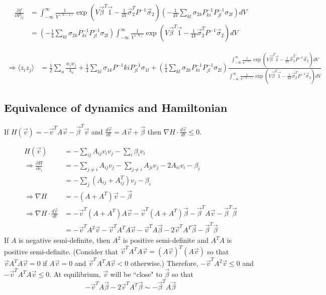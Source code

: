 \documentclass{article}
\begin{document}
\begin{align*}
\frac{\partial f}{\partial P_{ij}}&=\int_{-\infty}^\infty\frac{1}{V^{(N-1)}}\exp\left(V\vec{\beta}^T\vec{1}-\frac{1}{4V}\vec{\sigma}_2^TP^{-1}\vec{\sigma}_2\right)\left(-\frac{1}{4V}\sum_{kl}\sigma_{2k}P^{-1}_{ki}P^{-1}_{jl}\sigma_{2l}\right)dV
\\&=\left(-\frac{1}{4}\sum_{kl}\sigma_{2k}P^{-1}_{ki}P^{-1}_{jl}\sigma_{2l}\right)\int_{-\infty}^\infty\frac{1}{V^{(N)}}\exp\left(V\vec{\beta}^T\vec{1}-\frac{1}{4V}\vec{\sigma}_2^TP^{-1}\vec{\sigma}_2\right)dV
\end{align*}

\small{
\begin{align*}
\Rightarrow\langle z_iz_j\rangle &=\frac{1}{2}\sum_a\frac{w_iw_j}{\lambda_a}+\frac{1}{4}\sum_{kl}\sigma_{1k}P^{-1}{ki}P^{-1}_{jl}\sigma_{1l}+\left(\frac{1}{4}\sum_{kl}\sigma_{2k}P^{-1}_{ki}P^{-1}_{jl}\sigma_{2l}\right)\frac{\int_{-\infty}^\infty\frac{1}{V^{(N)}}\exp\left(V\vec{\beta}^T\vec{1}-\frac{1}{4V}\vec{\sigma}_2^TP^{-1}\vec{\sigma}_2\right)dV}{\int_{-\infty}^\infty\frac{1}{V^{(N-1)}}\exp\left(V\vec{\beta}^T\vec{1}-\frac{1}{4V}\vec{\sigma}_2^TP^{-1}\vec{\sigma}_2\right)dV}
\end{align*}}


\subsection{Equivalence of dynamics and Hamiltonian }
\begin{claim}
If $H(\vec{v})=-\vec{v}^TA\vec{v}-\vec{\beta}^T\vec{v}$ and $\frac{d\vec{v}}{dt}=A\vec{v}+\vec{\beta}$ then $\nabla H\cdot \frac{d\vec{v}}{dt}\leq 0$.
\end{claim}
\begin{pf}
\begin{align*}
H(\vec{v})&=-\sum_{ij}A_{ij}v_iv_j-\sum_i\beta_iv_i
\\\Rightarrow\frac{\partial H}{\partial v_i}&=-\sum_{j\neq i}A_{ij}v_j-\sum_{j\neq i}A_{ji}v_j-2A_{ii}v_i-\beta_i
\\&=-\sum_j(A_{ij}+A^T_{ij})v_j-\beta_i
\\ \Rightarrow \nabla H&=-(A+A^T)\vec{v}-\vec{\beta}
\\ \Rightarrow \nabla H\cdot \frac{d\vec{v}}{dt}&=-\vec{v}^T(A+A^T)A\vec{v}-\vec{v}^T(A+A^T)\vec{\beta}-\vec{\beta}^TA\vec{v}-\vec{\beta}^T\vec{\beta}
\\&=-\vec{v}^TA^2\vec{v}-\vec{v}^TA^TA\vec{v}-\vec{v}^TA\vec{\beta}-2\vec{v}^TA^T\vec{\beta}-\vec{\beta}^T\vec{\beta}
\end{align*}
If $A$ is negative semi-definite, then $A^2$ is positive semi-definite and $A^TA$ is positive semi-definite.  (Consider that $\vec{v}^TA^TA\vec{v}=(A\vec{v})^T(A\vec{v})$ so that $\vec{v}A^TA\vec{v}=0$ if $A\vec{v}=0$ and $\vec{v}^TA^TA\vec{v}<0$ otherwise.) Therefore, $-\vec{v}^TA^2\vec{v}\leq 0$ and $-\vec{v}^TA^TA\vec{v}\leq 0$. At equilibrium, $\vec{v}$ will be ``close" to $\vec{\beta}$ so that $$-\vec{v}^TA\vec{\beta}-2\vec{v}^TA^T\vec{\beta}\sim-\vec{\beta}^TA\vec{\beta}$$
\end{pf}
\end{document}
